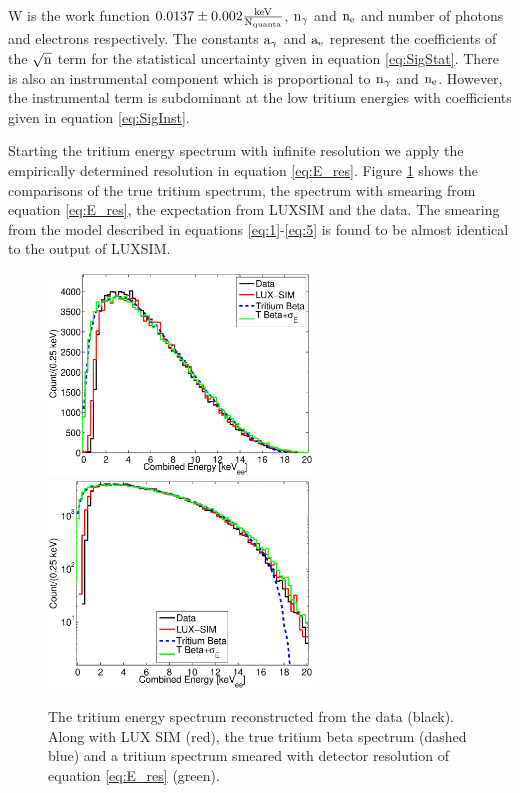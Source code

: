 \noindent W is the work function $0.0137\pm0.002 \rm \frac{keV}{N_{quanta}}$, $\rm n_\gamma$ and $\rm n_e$ and number of photons and electrons respectively. The constants $\rm a_\gamma$ and $\rm a_e$ represent the coefficients of the $\rm \sqrt{n}$ term for the statistical uncertainty given in equation \ref{eq:SigStat}. There is also an instrumental component which is proportional to $\rm n_\gamma$ and $\rm n_e$. However, the instrumental term is subdominant at the low tritium energies with coefficients given in equation \ref{eq:SigInst}.

Starting the tritium energy spectrum with infinite resolution we apply the empirically determined resolution in equation \ref{eq:E_res}. Figure \ref{fig:E_spec} shows the comparisons of the true tritium spectrum, the spectrum with smearing from equation \ref{eq:E_res}, the expectation from LUXSIM and the data. The smearing from the model described in equations \ref{eq:1}-\ref{eq:5} is found to be almost identical to the output of LUXSIM.

\newpage

 \begin{figure}[h!]\centering
\includegraphics[width=70mm]{Chapter_Flucs/Figures/E_Spec/E_spec_compare_SIM.eps}
\includegraphics[width=70mm]{Chapter_Flucs/Figures/E_Spec/E_spec_compare_SIM_log_.eps}
\caption{The tritium energy spectrum reconstructed from the data (black). Along with LUX SIM (red), the true tritium beta spectrum (dashed blue) and a tritium spectrum smeared with detector resolution of equation \ref{eq:E_res} (green). }
\label{fig:E_spec}
\end{figure}

